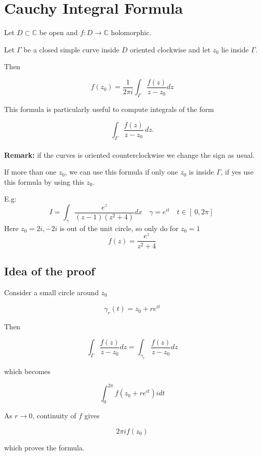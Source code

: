 \section{Cauchy Integral Formula}

\begin{theorem}
Let $D \subset \mathbb{C}$ be open and $f : D \to \mathbb{C}$ holomorphic.

Let $\Gamma$ be a closed simple curve inside $D$ oriented clockwise and let $z_0$ lie inside $\Gamma$.

Then

\[
f(z_0)
=
\frac{1}{2\pi i}
\int_\Gamma
\frac{f(z)}{z-z_0}dz
\]
\end{theorem}
This formula is particularly useful to compute integrals of the form

\[
\int_\Gamma \frac{f(z)}{z-z_0}\,dz.
\]
\\
\textbf{Remark:} if the curves is oriented counterclockwise we change the sign as usual.

If more than one $z_0$, we can use this formula if only one $z_0$ is inside $\Gamma$, if yes use this formula by using this $z_0$. 

E.g: 
\[
I = \int_{\gamma}^{} \frac{e^z}{(z-1)(z^2 + 4)} dx \quad \gamma = e^{it} \quad t \in [\ 0,2 \pi ]\
\]
Here $z_0 = 2i, -2i$ is out of the unit circle, so only do for $z_0 = 1$ \[
  f(z) = \frac{e^z}{z^2 + 4}
\]
\subsection*{Idea of the proof}

Consider a small circle around $z_0$

\[
\gamma_r(t) = z_0 + re^{it}
\]

Then

\[
\int_\Gamma \frac{f(z)}{z-z_0}dz
=
\int_{\gamma_r} \frac{f(z)}{z-z_0}dz
\]

which becomes

\[
\int_0^{2\pi} f(z_0 + re^{it}) i dt
\]

As $r \to 0$, continuity of $f$ gives

\[
2\pi i f(z_0)
\]

which proves the formula.

